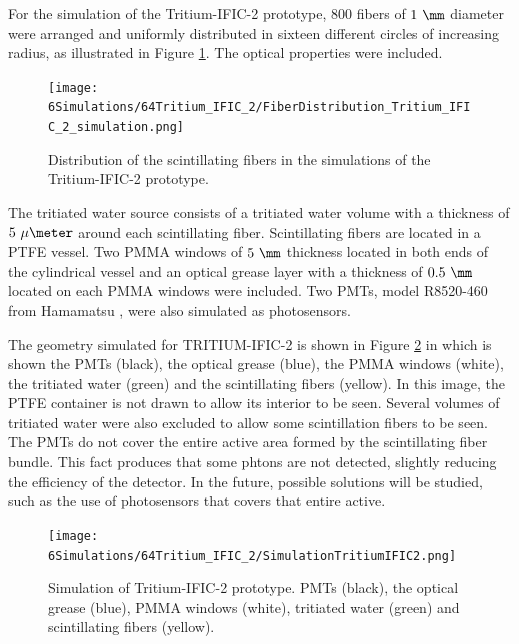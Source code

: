 For the simulation of the Tritium-IFIC-2 prototype, $800$ fibers of $1~\mm$ diameter were arranged and uniformly distributed in sixteen different circles of increasing radius, as illustrated in Figure \ref{fig:FibersTritiumIFIC2Simulation}. The optical properties were included.

\begin{figure}[h]
\centering
\texttt{[image: 6Simulations/64Tritium\_IFIC\_2/FiberDistribution\_Tritium\_IFIC\_2\_simulation.png]}
\caption{Distribution of the scintillating fibers in the simulations of the Tritium-IFIC-2 prototype.\label{fig:FibersTritiumIFIC2Simulation}}
\end{figure}
The tritiated water source consists of a tritiated water volume with a thickness of $5~\mu\meter$ around each scintillating fiber. Scintillating fibers are located in a PTFE vessel. Two PMMA windows of $5~\mm$ thickness located in both ends of the cylindrical vessel and an optical grease layer with a thickness of $0.5~\mm$ located on each PMMA windows were included. Two PMTs, model R8520-460 from Hamamatsu \cite{DataSheetPMTs}, were also simulated as photosensors. 


The geometry simulated for TRITIUM-IFIC-2 is shown in Figure \ref{fig:TritiumIFIC2Simulation} in which is shown the PMTs (black), the optical grease (blue), the PMMA windows (white), the tritiated water (green) and the scintillating fibers (yellow). In this image, the PTFE container is not drawn to allow its interior to be seen. Several volumes of tritiated water were also excluded to allow some scintillation fibers to be seen. The PMTs do not cover the entire active area formed by the scintillating fiber bundle. This fact produces that some phtons are not detected, slightly reducing the efficiency of the detector. In the future, possible solutions will be studied, such as the use of photosensors that covers that entire active.

\begin{figure}[h]
\centering
\texttt{[image: 6Simulations/64Tritium\_IFIC\_2/SimulationTritiumIFIC2.png]}
\caption{Simulation of Tritium-IFIC-2 prototype. PMTs (black), the optical grease (blue), PMMA windows (white), tritiated water (green) and scintillating fibers (yellow). \label{fig:TritiumIFIC2Simulation}}
\end{figure}

